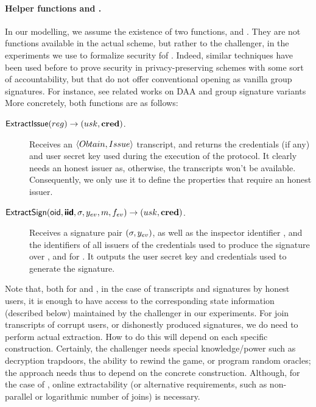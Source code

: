 \paragraph{Helper functions \ExtractIssue and \ExtractSign.} In our modelling,
we assume the existence of two functions, \ExtractIssue and \ExtractSign. They
are not functions available in the actual scheme, but rather to the challenger,
in the experiments we use to formalize security fof \UAS. Indeed, similar
techniques have been used before to prove security in privacy-preserving schemes
with some sort of accountability, but that do not offer conventional opening as
vanilla group signatures. For instance, see related works on DAA
\cite{bfg+11,cdl16} and group signature variants \cite{dl21,fgl21,gl19,lnpy21}
More concretely, both functions are as follows:

\begin{description}
\item[$\mathsf{ExtractIssue}(reg) \rightarrow (usk,\mathbf{cred})$.] Receives an
$\langle Obtain, Issue \rangle$ transcript, and returns the credentials (if
any) and user secret key used during the execution of the protocol. It clearly
needs an honest issuer as, otherwise, the transcripts won't be available.
Consequently, we only use it to define the properties that require an honest
issuer.
\item[$\mathsf{ExtractSign}(\mathsf{oid},\boldsymbol{\mathsf{\mathsf{iid}}},\sigma,y_{ev},m,f_{ev}) \rightarrow (usk,\mathbf{cred})$.]
Receives a signature pair $(\sigma,y_{ev})$, as well as the inspector identifier
\oid, and the identifiers of all issuers of the credentials used to produce the
signature over \msg, and for \feval. It outputs the user secret key
and credentials used to generate the signature.
\end{description}

Note that, both for \ExtractIssue and \ExtractSign, in the case of transcripts
and signatures by honest users, it is enough to have access to the corresponding
state information (described below) maintained by the challenger in our
experiments. For join transcripts of corrupt users, or dishonestly produced
signatures, we do need to perform actual extraction. How to do this will depend
on each specific construction. Certainly, the challenger needs special
knowledge/power such as decryption trapdoors, the ability to rewind the game, or
program random oracles; the approach needs thus to depend on the concrete
construction. Although, for the case of \ExtractIssue, online extractability
(or alternative requirements, such as non-parallel or logarithmic number of
joins) is necessary.  

